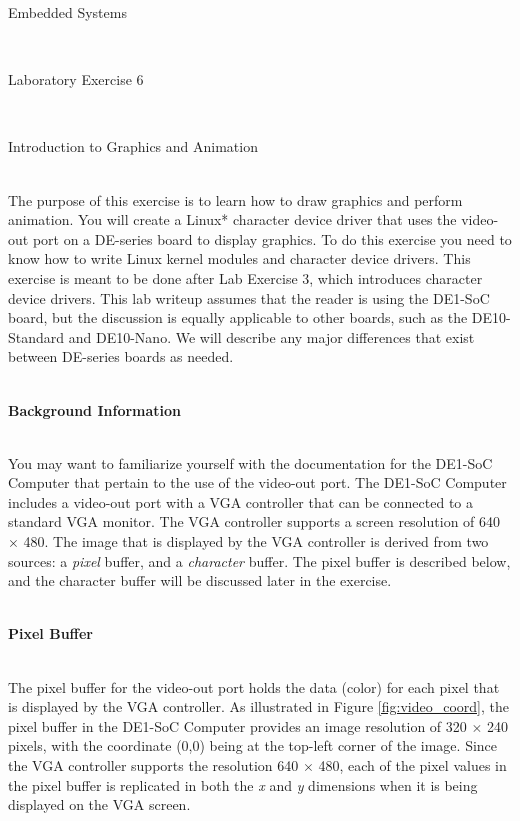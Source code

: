 \documentclass[epsfig,10pt,fullpage]{article}
\newcommand{\LabNum}{6}
\begin{document}
\centerline{\huge Embedded Systems}
~\\
\centerline{\huge Laboratory Exercise \LabNum}
~\\
\centerline{\large Introduction to Graphics and Animation}
~\\

\noindent
The purpose of this exercise is to learn how to draw graphics and perform animation. You will 
create a Linux* character device driver that uses the video-out port on a DE-series board to
display graphics. To do this exercise you need to know how to write Linux kernel modules and 
character device drivers. This exercise is meant to be done after Lab Exercise 3, which 
introduces character device drivers. This lab writeup assumes that the reader is using the 
DE1-SoC board, but the discussion is equally applicable to other boards, such as the 
DE10-Standard and DE10-Nano. We will describe any major differences that exist between 
DE-series boards as needed. 

~\\
\noindent
{\bf Background Information}

~\\
\noindent
You may want to familiarize yourself with the documentation for the DE1-SoC Computer that 
pertain to the use of the video-out port. The DE1-SoC Computer includes a video-out port 
with a VGA controller that can be connected to a standard VGA monitor. The VGA controller 
supports a screen resolution of 640 $\times$ 480. The image that is displayed by the 
VGA controller is derived from two sources: a {\it pixel} buffer, and a {\it character} 
buffer. The pixel buffer is described below, and the character buffer will be discussed 
later in the exercise.

~\\
\noindent
{\bf Pixel Buffer}
\label{sec:pixel_buffer}

~\\
\noindent
The pixel buffer for the video-out port holds the data (color) for each pixel that is 
displayed by the VGA controller.  As illustrated in Figure \ref{fig:video_coord}, the
pixel buffer in the DE1-SoC Computer provides an image resolution of 320 $\times$ 240 pixels, 
with the coordinate (0,0) being at the top-left corner of the image.  Since the VGA 
controller supports the resolution 640 $\times$ 480, each of the pixel values in the pixel 
buffer is replicated in both the {\it x} and {\it y} dimensions when it is being displayed 
on the VGA screen.
\end{document}
